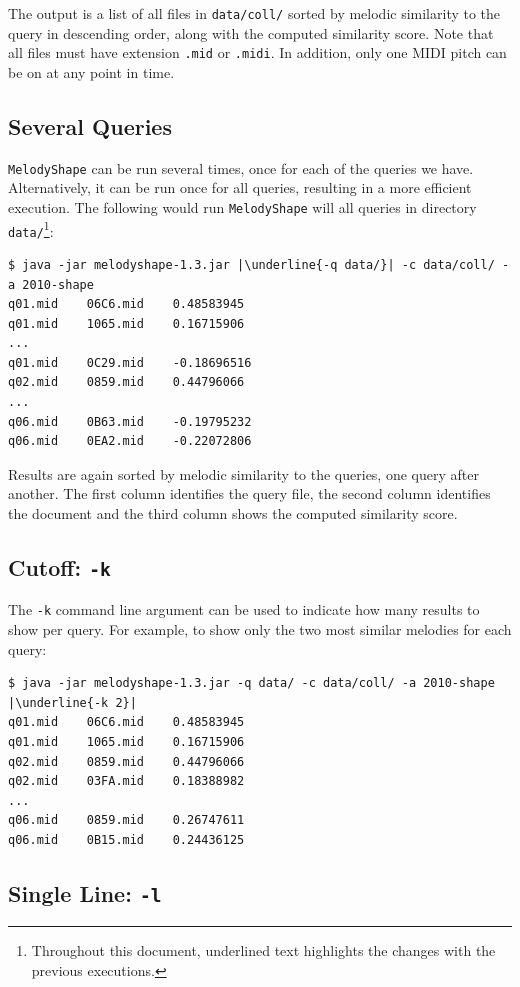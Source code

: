 \documentclass[twoside]{article}
\begin{document}
The output is a list of all files in \texttt{data/coll/} sorted by melodic similarity to the query in descending order, along with the computed similarity score. Note that all files must have extension \texttt{.mid} or \texttt{.midi}. In addition, only one MIDI pitch can be on at any point in time.

\subsection{Several Queries}

\texttt{MelodyShape} can be run several times, once for each of the queries we have. Alternatively, it can be run once for all queries, resulting in a more efficient execution. The following would run \texttt{MelodyShape} will all queries in directory \texttt{data/}\footnote{Throughout this document, underlined text highlights the changes with the previous executions.}:
\begin{lstlisting}
$ java -jar melodyshape-1.3.jar |\underline{-q data/}| -c data/coll/ -a 2010-shape
q01.mid    06C6.mid    0.48583945
q01.mid    1065.mid    0.16715906
...
q01.mid    0C29.mid    -0.18696516
q02.mid    0859.mid    0.44796066
...
q06.mid    0B63.mid    -0.19795232
q06.mid    0EA2.mid    -0.22072806
\end{lstlisting}

Results are again sorted by melodic similarity to the queries, one query after another. The first column identifies the query file, the second column identifies the document and the third column shows the computed similarity score.

\subsection{Cutoff: \texttt{-k}}

The \texttt{-k} command line argument can be used to indicate how many results to show per query. For example, to show only the two most similar melodies for each query:
\begin{lstlisting}
$ java -jar melodyshape-1.3.jar -q data/ -c data/coll/ -a 2010-shape |\underline{-k 2}|
q01.mid    06C6.mid    0.48583945
q01.mid    1065.mid    0.16715906
q02.mid    0859.mid    0.44796066
q02.mid    03FA.mid    0.18388982
...
q06.mid    0859.mid    0.26747611
q06.mid    0B15.mid    0.24436125
\end{lstlisting}

\subsection{Single Line: \texttt{-l}}
\end{document}

